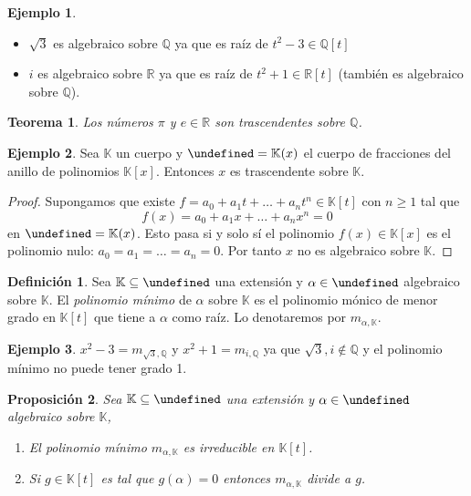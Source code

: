 \documentclass[10pt, spanish]{report}
\newtheorem{tma}{Teorema}[chapter]
\newtheorem{prop}[tma]{Proposición}
\theoremstyle{definition}
\newtheorem*{defin}{Definición}
\newtheorem*{ej}{Ejemplo}
\theoremstyle{custom}
\theoremstyle{remark}
\newcommand{\Q}{\mathbb{Q}}
\newcommand{\R}{\mathbb{R}}
\newcommand{\K}{\mathbb{K}}
\let\L\undefined
\newcommand{\L}{\mathbb{L}}
\renewcommand{\geq}{\geqslant}
\begin{document}
\begin{ej}\hspace{0pt}
    \begin{itemize}
        \item $\sqrt{3}$ es algebraico sobre $\Q$ ya que es raíz de $t^2-3\in\Q[t]$
        \item $i$ es algebraico sobre $\R$ ya que es raíz de $t^2+1\in \R[t]$
            (también es algebraico sobre $\Q$).
    \end{itemize}
\end{ej}

\begin{tma}
    Los números $\pi$ y $e\in\R$ son trascendentes sobre $\Q$.
\end{tma}

\begin{ej}
    Sea $\K$ un cuerpo y $\L=\K(x)$ el cuerpo de fracciones del anillo de
    polinomios $\K[x]$. Entonces $x$ es trascendente sobre $\K$.
\end{ej}

\begin{proof}
    Supongamos que existe $f=a_0+a_1t+\ldots+a_nt^n\in\K[t]$ con $n\geq1$ tal
    que \[f(x)=a_0+a_1x+\ldots+a_nx^n=0\] en $\L=\K(x)$. Esto pasa si y solo sí el
    polinomio $f(x)\in\K[x]$ es el polinomio nulo: $a_0=a_1=\ldots=a_n=0$. Por
    tanto $x$ no es algebraico sobre $\K$.
\end{proof}

\begin{defin}
    Sea $\K\subseteq\L$ una extensión y $\alpha\in\L$ algebraico sobre $\K$. El
    \textit{polinomio mínimo} de $\alpha$ sobre $\K$ es el polinomio mónico de
    menor grado en $\K[t]$ que tiene a $\alpha$ como raíz. Lo denotaremos por
    $m_{\alpha,\K}$.
\end{defin}

\begin{ej}
    $x^2-3=m_{\sqrt{3},\Q}$ y $x^2+1=m_{i,\Q}$ ya que $\sqrt{3},i\not\in\Q$ y el
    polinomio mínimo no puede tener grado 1.
\end{ej}

\begin{prop}\label{prop:pminirred}
    Sea $\K\subseteq\L$ una extensión y $\alpha\in \L$ algebraico sobre $\K$,
    \begin{enumerate}
        \item El polinomio mínimo $m_{\alpha,\K}$ es irreducible en $\K[t]$.
        \item Si $g\in \K[t]$ es tal que $g(\alpha)=0$ entonces $m_{\alpha,\K}$
            divide a $g$.
    \end{enumerate}
\end{prop}
\end{document}

